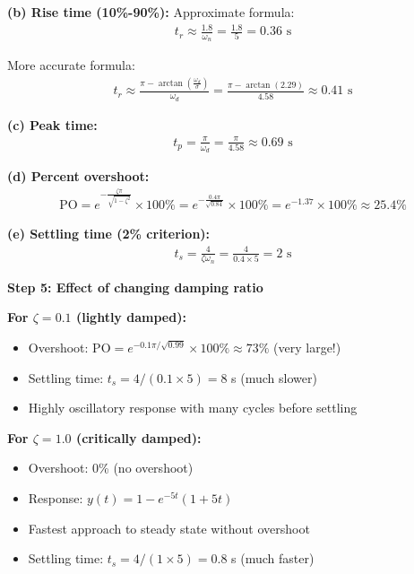\documentclass[11pt,a4paper]{article}
\begin{document}
\textbf{(b) Rise time (10\%-90\%):} Approximate formula:
\begin{align}
t_r \approx \frac{1.8}{\omega_n} = \frac{1.8}{5} = 0.36 \text{ s}
\end{align}

More accurate formula:
\begin{align}
t_r \approx \frac{\pi - \arctan\left(\frac{\omega_d}{\sigma}\right)}{\omega_d} = \frac{\pi - \arctan(2.29)}{4.58} \approx 0.41 \text{ s}
\end{align}

\textbf{(c) Peak time:}
\begin{align}
t_p = \frac{\pi}{\omega_d} = \frac{\pi}{4.58} \approx 0.69 \text{ s}
\end{align}

\textbf{(d) Percent overshoot:}
\begin{align}
\text{PO} = e^{-\frac{\zeta\pi}{\sqrt{1-\zeta^2}}} \times 100\% = e^{-\frac{0.4\pi}{\sqrt{0.84}}} \times 100\% = e^{-1.37} \times 100\% \approx 25.4\%
\end{align}

\textbf{(e) Settling time (2\% criterion):}
\begin{align}
t_s = \frac{4}{\zeta\omega_n} = \frac{4}{0.4 \times 5} = 2 \text{ s}
\end{align}

\textbf{Step 5: Effect of changing damping ratio}

\textbf{For $\zeta = 0.1$ (lightly damped):}
\begin{itemize}
\item Overshoot: $\text{PO} = e^{-0.1\pi/\sqrt{0.99}} \times 100\% \approx 73\%$ (very large!)
\item Settling time: $t_s = 4/(0.1 \times 5) = 8$ s (much slower)
\item Highly oscillatory response with many cycles before settling
\end{itemize}

\textbf{For $\zeta = 1.0$ (critically damped):}
\begin{itemize}
\item Overshoot: 0\% (no overshoot)
\item Response: $y(t) = 1 - e^{-5t}(1 + 5t)$
\item Fastest approach to steady state without overshoot
\item Settling time: $t_s = 4/(1 \times 5) = 0.8$ s (much faster)
\end{itemize}
\end{document}
